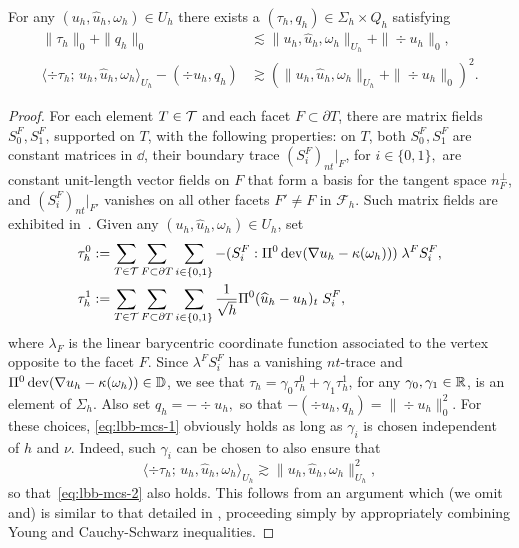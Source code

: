 \begin{lemma}\label{lemma:lbb_mcs} For any $(u_h, \hat{u}_h, \omega_h)
  \in U_h$ there exists a $(\tau_h,q_h) \in \Sigma_h \times Q_h$ satisfying
  \begin{align}
    \label{eq:lbb-mcs-1}
    \|\tau_h\|_0 + \| q_h \|_0
    & \lesssim \|u_h, \hat{u}_h, \omega_h\|_{U_h}
      + \| \div u_h \|_0,
    \\ \label{eq:lbb-mcs-2}
    \langle \div\tau_h; \, u_h,\hat u_h, \omega_h \rangle_{U_h} - (\div u_h,q_h)  & \gtrsim (\|u_h, \hat{u}_h, \omega_h\|_{U_h} + \| \div u_h \|_0)^2. %
  \end{align}   
\end{lemma}
\begin{proof}
  For each element $T \in \mathcal{T}$ and each facet $F\subset \partial T$,
  there are matrix fields $S^F_0, S^F_1$, supported on $T$, with the
  following properties: on $T$, both $S^F_0, S^F_1$ are constant
  matrices in $\dd$, their boundary trace  $(S^F_i)_{nt}|_F$,
  for $i \in \{0, 1\},$
  are constant unit-length vector fields on $F$ that form a basis for  the tangent
  space $n_F^\perp$, and $(S^F_i)_{nt}|_{F'}$ vanishes on all other
  facets $F' \ne F$ in $\mathcal{F}_h$. Such matrix fields are
  exhibited in~\cite[Lemma~5.1]{mcsI}.
  Given  any $(u_h, \hat{u}_h, \omega_h) \in U_h$, set
  \begin{align*}
    \tau_h^0 &:= \sum_{T\in\mathcal{T}}\sum_{F\subset\partial T} \sum_{i \in \{0,1\}}- ( S^F_i : \Pi^0\operatorname{dev}(\nabla u_h - \kappa(\omega_h))) \; \lambda^F S^F_i,
    \\
    \tau_h^1 &:= \sum_{T\in\mathcal{T}}\sum_{F\subset\partial T} \sum_{i \in \{0,1\}} \frac{1}{\sqrt{h}}\Pi^0(\widehat u_h - u_h)_t\; S^F_i,
  \end{align*}
  where $\lambda_F$ is the linear barycentric coordinate function
  associated to the vertex opposite to the facet $F$. Since
  $\lambda^FS^F_i$ has a vanishing $nt$-trace and
  $\Pi^0\operatorname{dev}(\nabla u_h - \kappa(\omega_h)) \in \mathbb{D}$, we see that
  $\tau_h = \gamma_0 \tau_h^0 + \gamma_1 \tau_h^1$, for any
  $\gamma_0,\gamma_1 \in \mathbb{R}$, is an element of $\Sigma_h$. Also set
  $q_h = -\div u_h,$ so that
  $-(\div u_h, q_h) = \| \div u_h \|_0^2$. For these choices,
  \eqref{eq:lbb-mcs-1} obviously holds as long as $\gamma_i$ is chosen
  independent of $h$ and $\nu$. Indeed, such $\gamma_i$ can be chosen
  to also ensure that
  \[
    \langle \div\tau_h;\, u_h,\hat u_h, \omega_h \rangle_{U_h}
    \gtrsim \|u_h,\hat{u}_h, \omega_h\|_{U_h}^2,
  \]
  so that~\eqref{eq:lbb-mcs-2} also holds. This follows from an  argument which (we
  omit and) is similar to that detailed in \cite[Lemma~6.5]{mcsII}, proceeding 
  simply by appropriately combining Young and Cauchy-Schwarz
  inequalities.
  \qqed
\end{proof}


